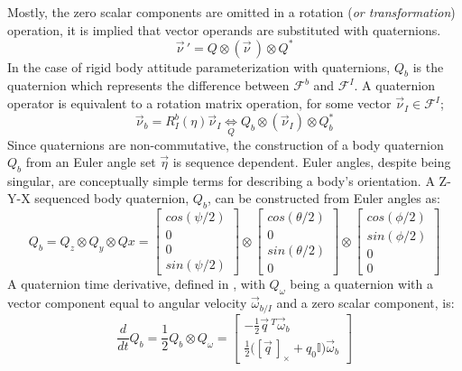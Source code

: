 Mostly, the zero scalar components are omitted in a rotation (\emph{or transformation}) operation, it is implied that vector operands are substituted with quaternions.
\begin{equation}\label{eq:quaternion-rotation}
\vec{\nu}\hspace{2pt}'=Q \otimes (\vec{\nu}\hspace{2pt}) \otimes Q^*
\end{equation} 
In the case of rigid body attitude parameterization with quaternions, $Q_b$ is the quaternion which represents the difference between $\mathcal{F}^b$ and $\mathcal{F}^I$. A quaternion operator is equivalent to a rotation matrix operation, for some vector $\vec{\nu}_I\in\mathcal{F}^I$;
\begin{equation}
\vec{\nu}_b=R_I^b(\eta)\vec{\nu}_I \underset{Q}{\iff} Q_b \otimes (\vec{\nu}_I) \otimes Q_b^*
\end{equation}
Since quaternions are non-commutative, the construction of a body quaternion $Q_b$ from an Euler angle set $\vec{\eta}$ is sequence dependent. Euler angles, despite being singular, are conceptually simple terms for describing a body's orientation. A Z-Y-X sequenced body quaternion, $Q_b$, can be constructed from Euler angles as:
\begin{equation}\label{eq:quaternion-sequence}
Q_b=Q_z\otimes Q_y\otimes Qx=\begin{bmatrix}
cos(\psi/2)\\
0\\
0\\
sin(\psi/2)
\end{bmatrix}
\otimes
\begin{bmatrix}
cos(\theta/2)\\
0\\
sin(\theta/2)\\
0
\end{bmatrix}
\otimes
\begin{bmatrix}
cos(\phi/2)\\
sin(\phi/2)\\
0\\
0
\end{bmatrix}
\end{equation}
A quaternion time derivative, defined in \cite{quaterniondynamics}, with $Q_\omega$ being a quaternion with a vector component equal to angular velocity $\vec{\omega}_{b/I}$ and a zero scalar component, is:
\begin{equation}\label{eq:quaternion-deriv}
\frac{d}{dt}Q_b=\frac{1}{2}Q_b\otimes Q_{\omega}=\begin{bmatrix}
-\frac{1}{2}\vec{q}\hspace{2pt}^{T} \vec{\omega}_b\\
\frac{1}{2}\big([\vec{q}\hspace{2pt}]_\times+q_0\mathbb{I}\big)\vec{\omega}_b
\end{bmatrix}
\end{equation}
